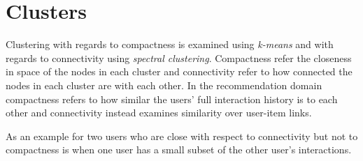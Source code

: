 
\section{Clusters}\label{sec:clusters}

Clustering with regards to compactness is examined using \textit{k-means} and with regards to connectivity using \textit{spectral clustering}. Compactness refer the closeness in space of the nodes in each cluster and connectivity refer to how connected the nodes in each cluster are with each other. In the recommendation domain compactness refers to how similar the users' full interaction history is to each other and connectivity instead examines similarity over user-item links.

As an example for two users who are close with respect to connectivity but not to compactness is when one user has a small subset of the other user's interactions.



\newpage


\newpage


